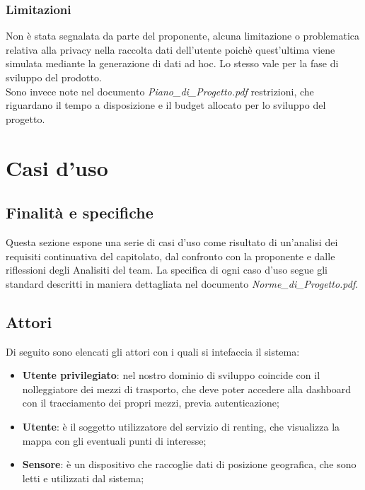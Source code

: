 \documentclass[11pt]{article}
\begin{document}
\begin{justify}
\subsubsection{Limitazioni}
Non è stata segnalata da parte del proponente, alcuna limitazione o problematica relativa alla privacy nella raccolta dati dell'utente poichè quest'ultima viene simulata mediante la generazione di dati ad hoc. Lo stesso vale per la fase di sviluppo del prodotto.\\
Sono invece note nel documento \textit{Piano\_di\_Progetto.pdf} restrizioni, che riguardano il tempo a disposizione e il budget allocato per lo sviluppo del progetto. 

\newpage
\section{Casi d'uso}
\label{sec:casi-uso}

\subsection{Finalità e specifiche}
Questa sezione espone una serie di casi d'uso come risultato di un'analisi dei requisiti continuativa del capitolato, dal confronto con la proponente e dalle riflessioni degli Analisiti del team. La specifica di ogni caso d'uso segue gli standard descritti in maniera dettagliata nel documento \textit{Norme\_di\_Progetto.pdf}.
\subsection{Attori}
Di seguito sono elencati gli attori con i quali si intefaccia il sistema:
\begin{itemize}
    \item \textbf{Utente privilegiato}: nel nostro dominio di sviluppo coincide con il nolleggiatore dei mezzi di trasporto, che deve poter accedere alla dashboard con il tracciamento dei propri mezzi, previa autenticazione;
    \item \textbf{Utente}: è il soggetto utilizzatore del servizio di renting, che visualizza la mappa con gli eventuali punti di interesse;
    \item \textbf{Sensore}: è un dispositivo che raccoglie dati di posizione geografica, che sono letti e utilizzati dal sistema;
\end{itemize}


\end{justify}
\end{document}
